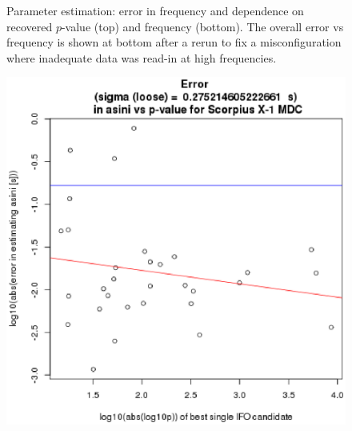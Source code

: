 \begin{figure}
\begin{center}
\caption{Parameter estimation: error in frequency and dependence on recovered $p$-value (top) and frequency (bottom). 
The overall error vs frequency is shown at bottom after a rerun to fix a misconfiguration where inadequate data was read-in at high frequencies.
\label{fig:errorf}}
\end{center}
\end{figure}


\begin{figure}
\begin{center}
\includegraphics[width=0.5\paperwidth,height=0.35\paperheight]{ErrorAsini.eps}

\end{center}
\end{figure}
